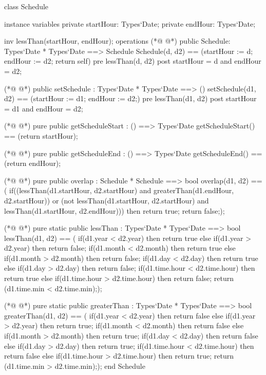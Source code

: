 \begin{vdmpp}[breaklines=true]
class Schedule

instance variables
  private startHour: Types`Date;
  private endHour: Types`Date;
  
  inv lessThan(startHour, endHour);
operations 
(*@
\label{Schedule:9}
@*)
 public Schedule: Types`Date * Types`Date ==> Schedule
  Schedule(d, d2) == (startHour := d; endHour := d2; return self)
 pre lessThan(d, d2)
 post startHour = d and endHour = d2;
 
(*@
\label{setSchedule:14}
@*)
 public setSchedule : Types`Date * Types`Date ==> ()
  setSchedule(d1, d2) == (startHour := d1; endHour := d2;)
 pre lessThan(d1, d2)
 post startHour = d1 and endHour = d2;
  
(*@
\label{getScheduleStart:19}
@*)
 pure public getScheduleStart : () ==> Types`Date
  getScheduleStart() == (return startHour);
  
(*@
\label{getScheduleEnd:22}
@*)
 pure public getScheduleEnd : () ==> Types`Date
  getScheduleEnd() == (return endHour);
 
(*@
\label{overlap:25}
@*)
 pure public overlap : Schedule * Schedule ==> bool
  overlap(d1, d2) == (
          if((lessThan(d1.startHour, d2.startHour) and greaterThan(d1.endHour, d2.startHour)) or
          (not lessThan(d1.startHour, d2.startHour) and lessThan(d1.startHour, d2.endHour)))
           then return true;
          return false;);

(*@
\label{lessThan:32}
@*)
 pure static public lessThan : Types`Date * Types`Date ==> bool
  lessThan(d1, d2) == (
          if(d1.year < d2.year)
           then return true
          else if(d1.year > d2.year)
           then return false;
          if(d1.month < d2.month)
           then return true
          else if(d1.month > d2.month)
           then return false;
          if(d1.day < d2.day)
           then return true
          else if(d1.day > d2.day)
           then return false;
          if(d1.time.hour < d2.time.hour)
           then return true
          else if(d1.time.hour > d2.time.hour)
           then return false;
          return (d1.time.min < d2.time.min););
          
(*@
\label{greaterThan:52}
@*)
 pure static public greaterThan : Types`Date * Types`Date ==> bool
  greaterThan(d1, d2) == (
          if(d1.year < d2.year)
           then return false
          else if(d1.year > d2.year)
           then return true;
          if(d1.month < d2.month)
           then return false
          else if(d1.month > d2.month)
           then return true;
          if(d1.day < d2.day)
           then return false
          else if(d1.day > d2.day)
           then return true;
          if(d1.time.hour < d2.time.hour)
           then return false
          else if(d1.time.hour > d2.time.hour)
           then return true;
          return (d1.time.min > d2.time.min););
end Schedule
\end{vdmpp}
